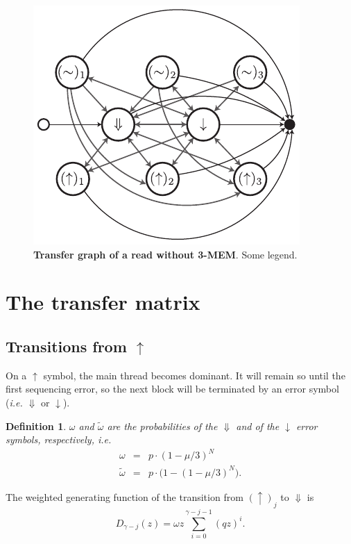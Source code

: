 \documentclass{article}
\newtheorem{definition}{Definition}
\begin{document}
\begin{figure}[h]
\centering
\includegraphics[scale=1]{no_3MEM_graph.pdf}
\caption{\textbf{Transfer graph of a read without 3-MEM}. 
Some legend.}
\label{fig:noMEM_graph}
\end{figure}



\section{The transfer matrix}

\subsection{Transitions from $\uparrow$}
\label{sec:trans_from_up}

On a $\uparrow$ symbol, the main thread becomes dominant. It will remain
so until the first sequencing error, so the next block will be terminated
by an error symbol (\textit{i.e.} $\Downarrow$ or $\downarrow$).

\begin{definition}
$\omega$ and $\tilde{\omega}$ are the probabilities of the $\Downarrow$
and of the $\downarrow$ error symbols, respectively, \textit{i.e.}
\begin{eqnarray}
\omega &=& p \cdot (1-\mu/3)^N \\
\tilde{\omega} &=& p \cdot \big( 1-(1-\mu/3)^N \big).
\end{eqnarray}
\end{definition}

The weighted generating function of the transition from $(\uparrow)_j$ to
$\Downarrow$ is
\begin{equation}
D_{\gamma-j}(z) = \omega z \sum_{i=0}^{\gamma-j-1} (qz)^i.
\end{equation}
\end{document}
